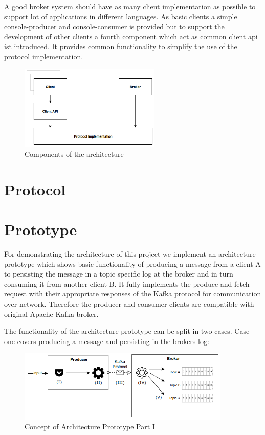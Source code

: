A good broker system should have as many client implementation as possible to
support lot of applications in different languages. As basic clients a simple
console-producer and console-consumer is provided but to support the development
of other clients a fourth component which act as common client api ist
introduced. It provides common functionality to simplify the use of the protocol
implementation. 

\begin{figure}[H]
    \centering
    \includegraphics[width=0.6\textwidth]{images/architecture-components.png}
    \caption{Components of the architecture}
    \label{fig:architecture-components.png}
\end{figure}

\section{Protocol}
\label{sec-protocol}

\section{Prototype}
For demonstrating the architecture of this project we implement an architecture
prototype which shows basic functionality of producing a message from a client A
to persisting the message in a  topic specific log at the broker and in turn consuming it from another
client B. It fully implements the produce and fetch request with their
appropriate responses of the Kafka protocol for communication over network.
Therefore the producer and consumer clients are compatible with original Apache
Kafka broker.

The functionality of the architecture prototype can be split in two cases.
Case one covers producing a message and persisting in the brokers log:
\begin{figure}[H]
    \centering
    \includegraphics[width=0.9\textwidth]{images/concept_producer.png}
    \caption{Concept of Architecture Prototype Part I}
    \label{fig:conept-producer}
\end{figure}

